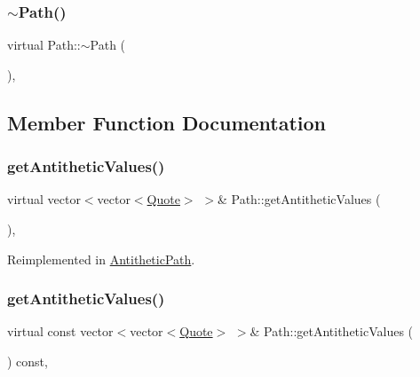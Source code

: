 \hypertarget{class_path_a11618e66fc700531d3ad998acfdb88a3}{}\label{class_path_a11618e66fc700531d3ad998acfdb88a3} 
\subsubsection{\texorpdfstring{$\sim$\+Path()}{~Path()}}
{\footnotesize\ttfamily virtual Path\+::$\sim$\+Path (\begin{DoxyParamCaption}{ }\end{DoxyParamCaption})\hspace{0.3cm}{\ttfamily [inline]}, {\ttfamily [virtual]}}



\subsection{Member Function Documentation}
\hypertarget{class_path_ae6097f4761ac45d2d3656c35f09563f0}{}\label{class_path_ae6097f4761ac45d2d3656c35f09563f0} 
\subsubsection{\texorpdfstring{get\+Antithetic\+Values()}{getAntitheticValues()}\hspace{0.1cm}{\footnotesize\ttfamily [1/2]}}
{\footnotesize\ttfamily virtual vector$<$vector$<$\hyperlink{_name_def_8h_a642a6c5fd87319d922637de0e0bb0305}{Quote}$>$ $>$\& Path\+::get\+Antithetic\+Values (\begin{DoxyParamCaption}{ }\end{DoxyParamCaption})\hspace{0.3cm}{\ttfamily [inline]}, {\ttfamily [virtual]}}



Reimplemented in \hyperlink{class_antithetic_path_a7f94c2a66c0d16ebedba930fbca9d859}{Antithetic\+Path}.

\hypertarget{class_path_aadadd7f7ad38c779e36f3ef2805f30e9}{}\label{class_path_aadadd7f7ad38c779e36f3ef2805f30e9} 
\subsubsection{\texorpdfstring{get\+Antithetic\+Values()}{getAntitheticValues()}\hspace{0.1cm}{\footnotesize\ttfamily [2/2]}}
{\footnotesize\ttfamily virtual const vector$<$vector$<$\hyperlink{_name_def_8h_a642a6c5fd87319d922637de0e0bb0305}{Quote}$>$ $>$\& Path\+::get\+Antithetic\+Values (\begin{DoxyParamCaption}{ }\end{DoxyParamCaption}) const\hspace{0.3cm}{\ttfamily [inline]}, {\ttfamily [virtual]}}



